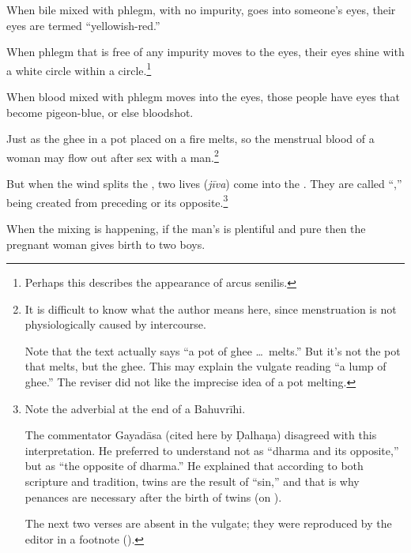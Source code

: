 \begin{translation}
\begin{sloka}
    
When bile mixed with phlegm, with no impurity, goes into
someone's eyes, their eyes are termed “yellowish-red.”
    
When phlegm that is free of any impurity moves to the eyes, their
eyes shine with a white circle within a circle.\footnote{Perhaps this
    describes the appearance of arcus senilis.}
    
When blood mixed with phlegm moves into the eyes, those people
have eyes that become pigeon-blue, or else bloodshot.
  
    \end{sloka}

\item [3.2.36]

Just as the ghee in a pot placed on a fire melts, so the menstrual
blood of a woman may flow out after sex with a man.\footnote{It is
    difficult to know what the author means here, since menstruation is
    not physiologically caused by intercourse.
    
Note that the text actually says “a pot of ghee \ldots\ melts.”  But it's
not the pot that melts, but the ghee.  This may explain the vulgate
reading  “a lump of ghee.”  The reviser did not like
the imprecise idea of a pot melting.}

\item [3.2.37]

But when the wind splits the , two lives 
(\emph{jīva}) come into the .
They are called “,” being created from preceding
 or its opposite.\footnote{Note the adverbial 
 at the end of a Bahuvrīhi.  

The commentator Gayadāsa (cited here by Ḍalhaṇa) disagreed with this
interpretation.  He preferred to understand  not as
“dharma and its opposite,” but as “the opposite of dharma.” He
explained that according to both scripture and tradition, twins are
the result of  “sin,” and that is why penances are
necessary after the birth of twins (on ).

The next two verses are absent in the vulgate; they were reproduced by the 
editor in a footnote (\cite[348b, n.\,3]{vulgate}).}

\item [3.2.37.1]
\begin{sloka}
    When the mixing is happening, if the man's  is plentiful 
    and pure then the pregnant woman gives birth to two boys.
\end{sloka}


\end{translation}
